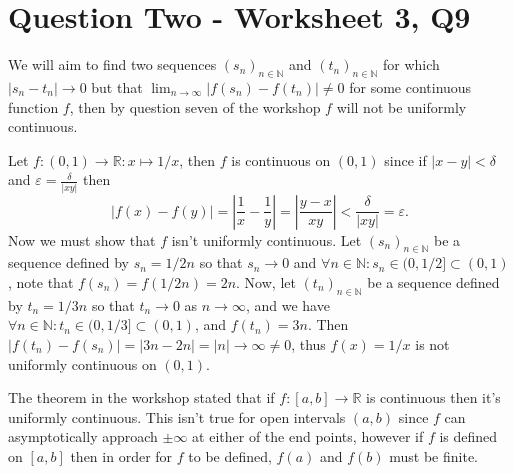 \documentclass{article}
\def \N {\mathbb{N}}
\def \R {\mathbb{R}}
\begin{document}
\section*{Question Two - Worksheet 3, Q9}

We will aim to find two sequences $(s_n)_{n\in\N}$ and $(t_n)_{n\in\N}$ for which $|s_n-t_n|\to0$ but that $\lim_{n\to\infty}|f(s_n)-f(t_n)| \neq 0$ for some continuous function $f$, then by question seven of the workshop $f$ will not be uniformly continuous.

Let $f:(0,1)\to\R:x\mapsto1/x$, then $f$ is continuous on $(0,1)$ since if $|x-y|<\delta$ and $\varepsilon = \frac{\delta}{|xy|}$ then
	\[
		|f(x)-f(y)| = \left|\frac1x - \frac1y\right| 
		= \left|\frac{y-x}{xy}\right| 
		< \frac{\delta}{|xy|} = \varepsilon.
	\]
Now we must show that $f$ isn't uniformly continuous. Let $(s_n)_{n\in\N}$ be a sequence defined by $s_n = 1/2n$ so that $s_n\to 0$ and $\forall n\in\N: s_n\in(0,1/2]\subset(0,1)$, note that $f(s_n) = f(1/2n) = 2n$. Now, let $(t_n)_{n\in\N}$ be a sequence defined by $t_n = 1/3n$ so that $t_n\to0$ as $n\to\infty$, and we have $\forall n\in\N: t_n\in(0,1/3]\subset(0,1)$, and $f(t_n) = 3n$. Then $|f(t_n)-f(s_n)| = |3n-2n|=|n|\to\infty\neq0$, thus $f(x)=1/x$ is not uniformly continuous on $(0,1)$.

The theorem in the workshop stated that if $f:[a,b]\to\R$ is continuous then it's uniformly continuous. This isn't true for open intervals $(a,b)$ since $f$ can asymptotically approach $\pm\infty$ at either of the end points, however if $f$ is defined on $[a,b]$ then in order for $f$ to be defined, $f(a)$ and $f(b)$ must be finite.


\newpage
\end{document}

